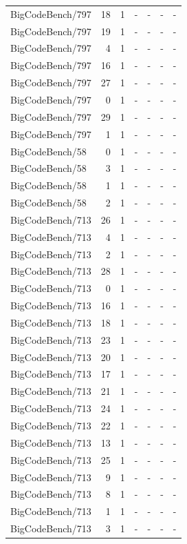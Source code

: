 \begin{longtable}{lrrllll}
BigCodeBench/797 & 18 & 1 & - & - & - & - \\
BigCodeBench/797 & 19 & 1 & - & - & - & - \\
BigCodeBench/797 & 4 & 1 & - & - & - & - \\
BigCodeBench/797 & 16 & 1 & - & - & - & - \\
BigCodeBench/797 & 27 & 1 & - & - & - & - \\
BigCodeBench/797 & 0 & 1 & - & - & - & - \\
BigCodeBench/797 & 29 & 1 & - & - & - & - \\
BigCodeBench/797 & 1 & 1 & - & - & - & - \\
BigCodeBench/58 & 0 & 1 & - & - & - & - \\
BigCodeBench/58 & 3 & 1 & - & - & - & - \\
BigCodeBench/58 & 1 & 1 & - & - & - & - \\
BigCodeBench/58 & 2 & 1 & - & - & - & - \\
BigCodeBench/713 & 26 & 1 & - & - & - & - \\
BigCodeBench/713 & 4 & 1 & - & - & - & - \\
BigCodeBench/713 & 2 & 1 & - & - & - & - \\
BigCodeBench/713 & 28 & 1 & - & - & - & - \\
BigCodeBench/713 & 0 & 1 & - & - & - & - \\
BigCodeBench/713 & 16 & 1 & - & - & - & - \\
BigCodeBench/713 & 18 & 1 & - & - & - & - \\
BigCodeBench/713 & 23 & 1 & - & - & - & - \\
BigCodeBench/713 & 20 & 1 & - & - & - & - \\
BigCodeBench/713 & 17 & 1 & - & - & - & - \\
BigCodeBench/713 & 21 & 1 & - & - & - & - \\
BigCodeBench/713 & 24 & 1 & - & - & - & - \\
BigCodeBench/713 & 22 & 1 & - & - & - & - \\
BigCodeBench/713 & 13 & 1 & - & - & - & - \\
BigCodeBench/713 & 25 & 1 & - & - & - & - \\
BigCodeBench/713 & 9 & 1 & - & - & - & - \\
BigCodeBench/713 & 8 & 1 & - & - & - & - \\
BigCodeBench/713 & 1 & 1 & - & - & - & - \\
BigCodeBench/713 & 3 & 1 & - & - & - & - \\

\end{longtable}
